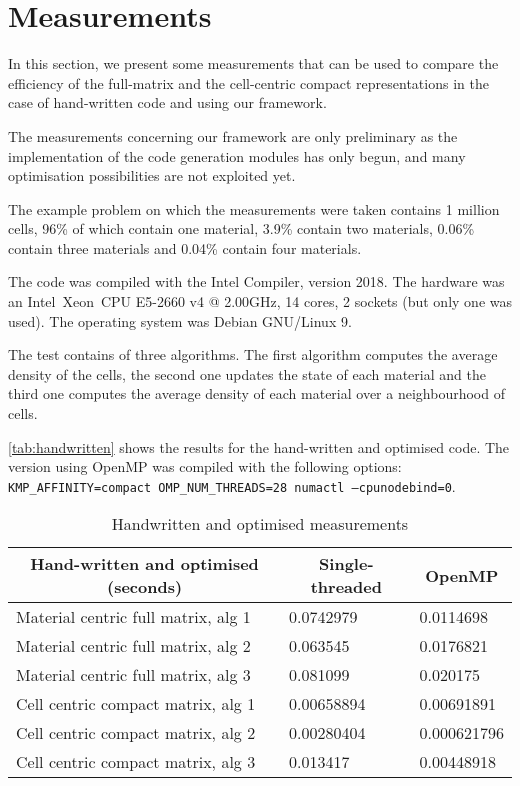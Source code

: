 \documentclass[fontsize=11pt, appendixprefix=true]{scrreprt}
\begin{document}
\section{Measurements}

In this section, we present some measurements that can be used to compare the
efficiency of the full-matrix and the cell-centric compact representations in
the case of hand-written code and using our framework.

The measurements concerning our framework are only preliminary as the
implementation of the code generation modules has only begun, and many
optimisation possibilities are not exploited yet.

The example problem on which the measurements were taken contains 1 million
cells, 96\% of which contain one material, 3.9\% contain two materials, 0.06\%
contain three materials and 0.04\% contain four materials.

The code was compiled with the Intel Compiler, version 2018. The hardware was an
Intel\textregistered\ Xeon\textregistered\ CPU E5-2660 v4 @ 2.00GHz, 14 cores, 2
sockets (but only one was used). The operating system was Debian GNU/Linux 9.

The test contains of three algorithms. The first algorithm computes the average
density of the cells, the second one updates the state of each material and the
third one computes the average density of each material over a neighbourhood of
cells.

\autoref{tab:handwritten} shows the results for the hand-written and optimised
code. The version using OpenMP was compiled with the following options:
\texttt{KMP\_AFFINITY=compact OMP\_NUM\_THREADS=28 numactl --cpunodebind=0}.

\begin{table}[h]
\begin{tabular}{|l|l|l|}
\hline
\multicolumn{1}{|c|}{\textbf{Hand-written and optimised (seconds)}} & \multicolumn{1}{c|}{Single-threaded} & \multicolumn{1}{c|}{OpenMP} \\ \hline
Material centric full matrix, alg 1                      & 0.0742979                            & 0.0114698                   \\ \hline
Material centric full matrix, alg 2                      & 0.063545                             & 0.0176821                   \\ \hline
Material centric full matrix, alg 3                      & 0.081099                             & 0.020175                    \\ \hline
Cell centric compact matrix, alg 1                       & 0.00658894                           & 0.00691891                  \\ \hline
Cell centric compact matrix, alg 2                       & 0.00280404                           & 0.000621796                 \\ \hline
Cell centric compact matrix, alg 3                       & 0.013417                             & 0.00448918                  \\ \hline
\end{tabular}
\caption {Handwritten and optimised measurements}
\label{tab:handwritten}
\end{table}
\end{document}
